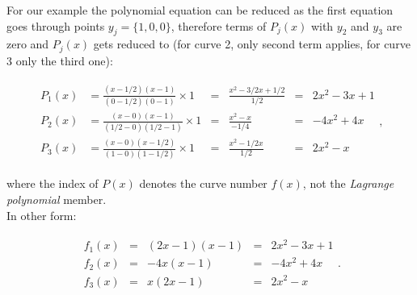 \documentclass[10pt,b5paper,titlepage]{book}
\begin{document}
For our example the polynomial equation can be reduced as the first equation
goes through points $y_{j} = \{1, 0, 0\}$, therefore terms of $P_{j}(x)$ with
$y_2$ and $y_3$ are zero and $P_{j}(x)$ gets reduced to (for curve 2, only
second term applies, for curve 3 only the third one):

\begin{eqnarray}
    \begin{split}
        P_1(x) &= \frac{(x - 1 / 2)(x - 1)}{(0 - 1 / 2)(0 - 1)} \times 1
               &=& \frac{x^{2} - 3 / 2 x + 1 / 2}{1 / 2}
               &=& 2 x^{2} - 3 x + 1 \\
        P_2(x) &= \frac{(x - 0)(x - 1)}{(1 / 2 - 0)(1 / 2 - 1)} \times 1
               &=& \frac{x^{2} - x}{- 1 / 4}
               &=& -4 x^2 + 4 x \\
        P_3(x) &= \frac{(x - 0)(x - 1 / 2)}{(1 - 0)(1 - 1 / 2)} \times 1
               &=& \frac{x^2 - 1 / 2 x}{1 / 2}
               &=& 2 x^2 - x
    \end{split}
,\end{eqnarray}

where the index of $P(x)$ denotes the curve number $f(x)$, not the
\textit{Lagrange polynomial} member.\\

In other form:

\begin{eqnarray}
    \begin{split}
        f_1(x) &=& (2 x - 1)(x - 1) &=& 2 x^2 - 3 x + 1 \\
        f_2(x) &=& -4 x (x - 1) &=& -4 x^2 + 4 x\\
        f_3(x) &=& x (2 x - 1) &=& 2 x^2 - x
    \end{split}
.\end{eqnarray}
\end{document}

